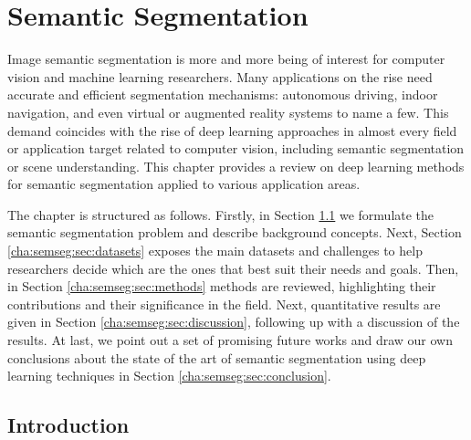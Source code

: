 \chapter{Semantic Segmentation}
\label{cha:semseg}

\begin{chapterabstract}
Image semantic segmentation is more and more being of interest for computer vision and machine learning researchers. Many applications on the rise need accurate and efficient segmentation mechanisms: autonomous driving, indoor navigation, and even virtual or augmented reality systems to name a few. This demand coincides with the rise of deep learning approaches in almost every field or application target related to computer vision, including semantic segmentation or scene understanding. This chapter provides a review on deep learning methods for semantic segmentation applied to various application areas.

The chapter is structured as follows. Firstly, in Section \ref{cha:semseg:sec:introduction} we formulate the semantic segmentation problem and describe background concepts. Next, Section \ref{cha:semseg:sec:datasets} exposes the main datasets and challenges to help researchers decide which are the ones that best suit their needs and goals. Then, in Section \ref{cha:semseg:sec:methods} methods are reviewed, highlighting their contributions and their significance in the field. Next, quantitative results are given in Section \ref{cha:semseg:sec:discussion}, following up with a discussion of the results. At last, we point out a set of promising future works and draw our own conclusions about the state of the art of semantic segmentation using deep learning techniques in Section \ref{cha:semseg:sec:conclusion}.
\end{chapterabstract}

\minitoc

\clearpage

\section{Introduction}
\label{cha:semseg:sec:introduction}

